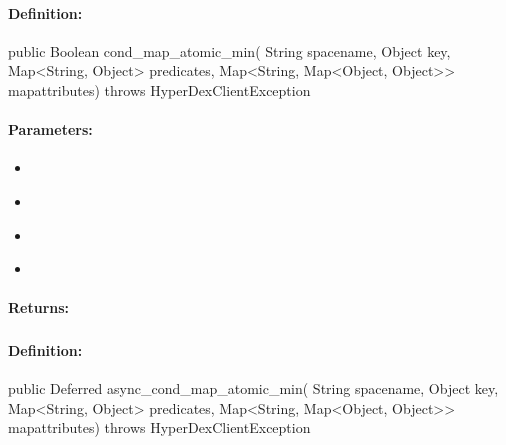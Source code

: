 \paragraph{Definition:}
\begin{javacode}
public Boolean cond_map_atomic_min(
        String spacename,
        Object key,
        Map<String, Object> predicates,
        Map<String, Map<Object, Object>> mapattributes) throws HyperDexClientException
\end{javacode}

\paragraph{Parameters:}
\begin{itemize}[noitemsep]
\item {}\\

\item {}\\

\item {}\\

\item {}\\

\end{itemize}

\paragraph{Returns:}


\pagebreak
\subsubsection{}
\label{api:java:async_cond_map_atomic_min}


\paragraph{Definition:}
\begin{javacode}
public Deferred async_cond_map_atomic_min(
        String spacename,
        Object key,
        Map<String, Object> predicates,
        Map<String, Map<Object, Object>> mapattributes) throws HyperDexClientException
\end{javacode}

